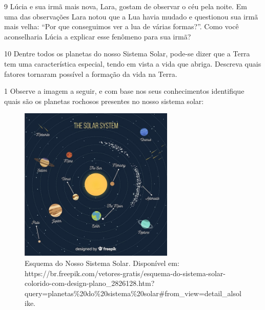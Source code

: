{{

\num{9}  Lúcia e sua irmã mais nova, Lara, gostam de observar o céu pela noite.
  Em uma das observações Lara notou que a Lua havia mudado e questionou
  sua irmã mais velha: ``Por que conseguimos ver a lua de várias
  formas?''. Como você aconselharia Lúcia a explicar esse fenômeno para
  sua irmã?



\num{10}  Dentre todos os planetas do nosso Sistema Solar, pode-se dizer que a
  Terra tem uma característica especial, tendo em vista a vida que
  abriga. Descreva quais fatores tornaram possível a formação da vida na
  Terra.




\num{1} Observe a imagem a seguir, e com base nos seus conhecimentos identifique quais são os planetas rochosos presentes no nosso sistema solar:

\begin{figure}[htpb!]
\includegraphics[width=2.89583in,height=2.89583in]{./imgs/img12.jpg}
\caption{Esquema do Nosso Sistema Solar. Disponível em:
https://br.freepik.com/vetores-gratis/esquema-do-sistema-solar-colorido-com-design-plano\_2826128.htm?query=planetas\%20do\%20sistema\%20solar\#from\_view=detail\_alsolike.}
\end{figure}

}}
